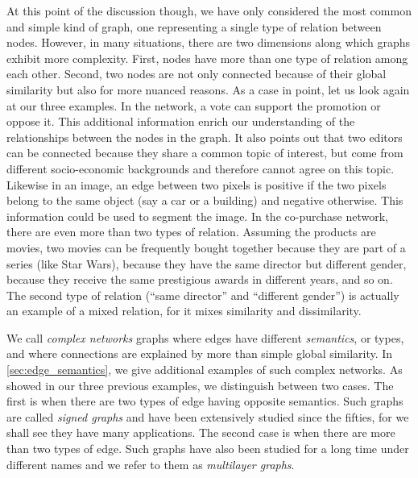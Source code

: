 At this point of the discussion though, we have only considered the most common and simple kind of
graph, one representing a single type of relation between nodes. However, in many situations, there
are two dimensions along which graphs exhibit more complexity. First, nodes have more than one type
of relation among each other. Second, two nodes are not only connected because of their global
similarity but also for more nuanced reasons. As a case in point, let us look again at our
three examples. In the \wik{} network, a vote can support the promotion or oppose it. This
additional information enrich our understanding of the relationships between the nodes in the graph.
It also points out that two editors can be connected because they share a common topic of interest,
but come from different socio-economic backgrounds and therefore cannot agree on this topic.
Likewise in an image, an edge between two pixels is positive if the two pixels belong to the same
object (say a car or a building) and negative otherwise. This information could be used to segment
the image. In the co-purchase network, there are even more than two types of relation. Assuming the
products are movies, two movies can be frequently bought together because they are part of a series
(like Star Wars), because they have the same director but different gender, because they receive the
same prestigious awards in different years, and so on. The second type of relation (\enquote{same
director} and \enquote{different gender}) is actually an example of a mixed relation, for it mixes
similarity and dissimilarity.

We call \emph{complex networks} graphs where edges have different \emph{semantics}, or types, and
where connections are explained by more than simple global similarity. In
\autoref{sec:edge_semantics}, we give additional examples of such complex networks. As
showed in our three previous examples, we distinguish between two cases. The first is when there are two types of
edge having opposite semantics. Such graphs are called \emph{signed graphs} and have been
extensively studied since the fifties, for we shall see they have many applications. The second case
is when there are more than two types of edge. Such graphs have also been studied for a long time
under different names and we refer to them as \emph{multilayer graphs}.

\medskip

